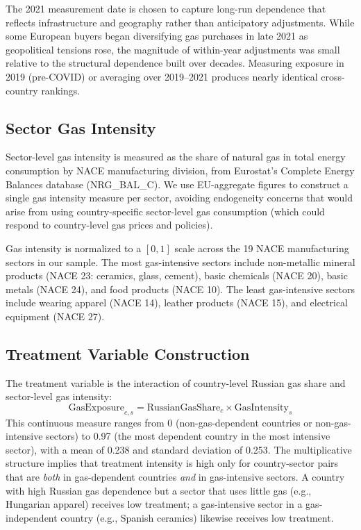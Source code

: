 \documentclass[12pt]{article}
\begin{document}
The 2021 measurement date is chosen to capture long-run dependence that reflects infrastructure and geography rather than anticipatory adjustments. While some European buyers began diversifying gas purchases in late 2021 as geopolitical tensions rose, the magnitude of within-year adjustments was small relative to the structural dependence built over decades. Measuring exposure in 2019 (pre-COVID) or averaging over 2019--2021 produces nearly identical cross-country rankings.

\subsection{Sector Gas Intensity}

Sector-level gas intensity is measured as the share of natural gas in total energy consumption by NACE manufacturing division, from Eurostat's Complete Energy Balances database (NRG\_BAL\_C). We use EU-aggregate figures to construct a single gas intensity measure per sector, avoiding endogeneity concerns that would arise from using country-specific sector-level gas consumption (which could respond to country-level gas prices and policies).

Gas intensity is normalized to a $[0, 1]$ scale across the 19 NACE manufacturing sectors in our sample. The most gas-intensive sectors include non-metallic mineral products (NACE 23: ceramics, glass, cement), basic chemicals (NACE 20), basic metals (NACE 24), and food products (NACE 10). The least gas-intensive sectors include wearing apparel (NACE 14), leather products (NACE 15), and electrical equipment (NACE 27).

\subsection{Treatment Variable Construction}

The treatment variable is the interaction of country-level Russian gas share and sector-level gas intensity:
\begin{equation}
    \text{GasExposure}_{c,s} = \text{RussianGasShare}_c \times \text{GasIntensity}_s
\end{equation}
This continuous measure ranges from 0 (non-gas-dependent countries or non-gas-intensive sectors) to 0.97 (the most dependent country in the most intensive sector), with a mean of 0.238 and standard deviation of 0.253. The multiplicative structure implies that treatment intensity is high only for country-sector pairs that are \textit{both} in gas-dependent countries \textit{and} in gas-intensive sectors. A country with high Russian gas dependence but a sector that uses little gas (e.g., Hungarian apparel) receives low treatment; a gas-intensive sector in a gas-independent country (e.g., Spanish ceramics) likewise receives low treatment.
\end{document}
